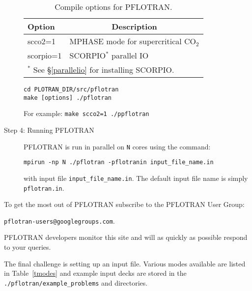 \begin{description}
\begin{table}[H]\centering
\caption{Compile options for PFLOTRAN.}

\vspace{3mm}

\label{topt}
\begin{tabular}{ll}
\toprule
Option & \multicolumn{1}{c}{Description}\\
\midrule
scco2=1 & MPHASE mode for supercritical CO$_2$\\
scorpio=1 & SCORPIO$^{*}$ parallel IO\\
\bottomrule
\multicolumn{2}{l}{$^{*}$ See \S\ref{parallelio} for installing SCORPIO.}
\end{tabular}

\end{table}

\footnotesize
\begin{Verbatim}
cd PLOTRAN_DIR/src/pflotran
make [options] ./pflotran
\end{Verbatim}
\normalsize

For example: {\footnotesize\tt make scco2=1 ./ppflotran}

\item[Step 4: Running PFLOTRAN] PFLOTRAN is run in parallel on {\tt N} cores using the command:

{\footnotesize\tt mpirun -np N ./pflotran -pflotranin input\_file\_name.in}

with input file {\footnotesize\tt input\_file\_name.in}. The default input file name is simply {\footnotesize\tt pflotran.in}.
\end{description}

\noindent
To get the most out of PFLOTRAN subscribe to the PFLOTRAN User Group:

{\footnotesize\tt pflotran-users@googlegroups.com}.

\noindent
PFLOTRAN developers monitor this site and will as quickly as possible respond to your queries.

The final challenge is setting up an input file. Various modes available are listed in Table~\ref{tmodes} and example input decks are stored in the {\footnotesize\tt ./pflotran/example\_problems} and  directories.

